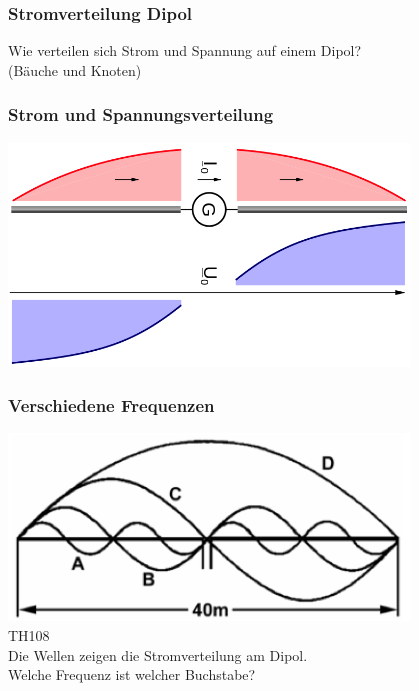 \begin{frame}
  \frametitle{Stromverteilung Dipol}
  \begin{center}
    \Large Wie verteilen sich Strom und Spannung auf einem Dipol? \\ (Bäuche und Knoten)
  \end{center}
\end{frame}

\begin{frame}
  \frametitle{Strom und Spannungsverteilung}
  \begin{center}
    \includegraphics[width=0.8\textwidth]{a09/DipolUI.png}
    \tiny \hyperlink{refs}{\cite{wm}} \\[1em] \large
  \end{center}
\end{frame}

\begin{frame}
  \frametitle{Verschiedene Frequenzen}
  \begin{center}
    \includegraphics[width=0.8\textwidth]{a09/TH108.png} \\
    \tiny \hyperlink{refs}{\cite{bna}} TH108\\[1em] \large
    Die Wellen zeigen die Stromverteilung am Dipol. \\Welche Frequenz ist welcher Buchstabe?
  \end{center}
\end{frame}


